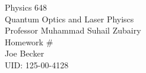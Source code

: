 \begin{titlepage}
\setlength{\topmargin}{1.5in}
\begin{center}
\Huge{Physics 648} \\
\LARGE{Quantum Optics and Laser Phyiscs} \\
\Large{Professor Muhammad Suhail Zubairy} \\[1cm]

\huge{Homework \#\HWnum}\\[0.5cm]

\large{Joe Becker} \\
\large{UID: 125-00-4128} \\
\large{\due} 

\end{center}

\end{titlepage}
